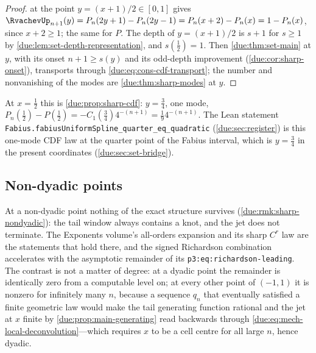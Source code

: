 \documentclass[11pt,oneside]{article}
\theoremstyle{plain}
\theoremstyle{definition}
\theoremstyle{remark}
\newcommand{\upn}[1]{\RvachevUp_{#1}}
\newcommand{\dep}[1]{s\!\left(#1\right)}                    %
\newcommand{\Cr}[2]{C_{#1}\!\left(#2\right)}                %
\newcommand{\qn}[1]{q_{#1}}                                 %
\begin{document}
\begin{proof}
 at the point $y=(x+1)/2\in[0,1]$ gives
$\upn{n+1}(y)=P_{n}(2y+1)-P_{n}(2y-1)=P_{n}(x+2)-P_{n}(x)=1-P_{n}(x)$,
since $x+2\ge1$; the same for $P$.  The depth of $y=(x+1)/2$ is $s+1$ for
$s\ge1$ by \cref{due:lem:set-depth-representation}, and $\dep{\tfrac12}=1$.
Then \cref{due:thm:set-main} at $y$, with its onset $n+1\ge\dep{y}$ and its
odd-depth improvement (\cref{due:cor:sharp-onset}), transports through
\cref{due:eq:cons-cdf-transport}; the number and nonvanishing of the modes
are \cref{due:thm:sharp-modes} at $y$.
\end{proof}

At $x=\tfrac12$ this is \cref{due:prop:sharp-cdf}: $y=\tfrac34$, one mode,
$P_{n}(\tfrac12)-P(\tfrac12)=-\Cr{1}{\tfrac34}4^{-(n+1)}=\tfrac19 4^{-(n+1)}$.
The Lean statement \texttt{Fabius.\allowbreak fabiusUniformSpline\_\allowbreak quarter\_\allowbreak eq\_\allowbreak quadratic}
(\cref{due:sec:register}) is this one-mode CDF law at the quarter point of
the Fabius interval, which is $y=\tfrac34$ in the present coordinates
(\cref{due:sec:set-bridge}).

\subsection{Non-dyadic points}
\label{due:sec:cons-nondyadic}

At a non-dyadic point nothing of the exact structure survives
(\cref{due:rmk:sharp-nondyadic}): the tail window always contains a knot,
and the jet does not terminate.  The Exponents volume's all-orders
expansion and its sharp $C^{r}$ law are the statements that hold there,
and the signed Richardson combination accelerates with the asymptotic
remainder of its \texttt{p3:eq:richardson-\allowbreak leading}.  The contrast is not a
matter of degree: at a dyadic point the remainder is identically zero from
a computable level on; at every other point of $(-1,1)$ it is nonzero for
infinitely many $n$, because a sequence $\qn{n}$ that eventually satisfied
a finite geometric law would make the tail generating function rational
and the jet at $x$ finite by \cref{due:prop:main-generating} read
backwards through \cref{due:eq:mech-local-deconvolution}---which requires
$x$ to be a cell centre for all large $n$, hence dyadic.
\end{document}
